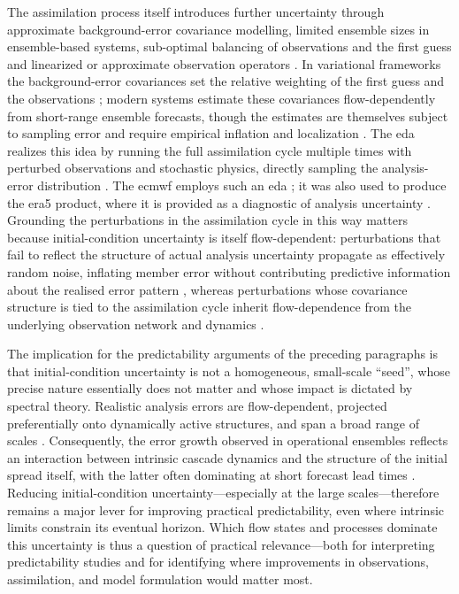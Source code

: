The assimilation process itself introduces further uncertainty through
approximate background-error covariance modelling, limited ensemble sizes
in ensemble-based systems, sub-optimal balancing of observations and the first
guess
and linearized or approximate observation operators
\parencite{houtekamerReviewEnsembleKalman2016,fengLimitsKnowingEquilibrium2026,
    bannisterReviewOperationalMethods2017, kalnayEarthSystemModeling2024}.
In variational frameworks the background-error covariances set the
relative weighting of the first guess and the observations
\parencite{bannisterReviewOperationalMethods2017}; modern systems estimate
these covariances flow-dependently from short-range ensemble forecasts,
though the estimates are themselves subject to sampling error and require
empirical inflation and localization
\parencite{houtekamerReviewEnsembleKalman2016}. The \gls{eda} realizes this
idea by running the full
assimilation cycle multiple times with perturbed observations and
stochastic physics, directly sampling the analysis-error distribution
\parencite{isaksenEnsembleDataAssimilations2010}. The \gls{ecmwf} employs
such an \gls{eda} \parencite{bonavitaEvolutionECMWFHybrid2016}; it was also
used to produce the \gls{era5} product, where it is provided as a
diagnostic of analysis uncertainty
\parencite{hersbachERA5GlobalReanalysis2020}. Grounding the perturbations
in the assimilation cycle in this way matters because initial-condition
uncertainty is itself flow-dependent: perturbations that fail to reflect
the structure of actual analysis uncertainty propagate as effectively
random noise, inflating member error without contributing predictive
information about the realised error pattern
\parencite{fengEnsembleForecastingForay2024}, whereas perturbations whose
covariance structure is tied to the assimilation cycle inherit
flow-dependence from the underlying observation network and dynamics
\parencite{leutbecherEnsembleForecasting2008}.

The implication for the predictability arguments of the preceding
paragraphs is that initial-condition uncertainty is not a homogeneous,
small-scale \enquote{seed}, whose precise nature essentially does not matter
and whose impact is dictated by spectral theory.
Realistic analysis errors are flow-dependent, projected preferentially
onto dynamically active structures, and span a broad range of scales
\parencite{magnussonFactorsInfluencingSkill2013,
    zhangWhatPredictabilityLimit2019}. Consequently, the error growth
observed in operational ensembles reflects an interaction between intrinsic
cascade dynamics and the structure of the initial spread itself, with the
latter often dominating at short forecast lead times
\parencite{selzTransitionPracticalIntrinsic2022,
    lloverasTwoFourdayPredictability2023}. Reducing initial-condition
uncertainty---especially at the large scales---therefore remains a major lever
for improving practical predictability, even where intrinsic limits constrain
its eventual horizon. Which flow states and processes dominate this
uncertainty is thus a question of practical relevance---both for interpreting
predictability studies and for identifying where improvements in observations,
assimilation, and model formulation would matter most.

